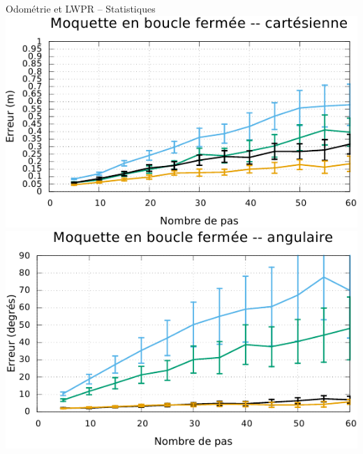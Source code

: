 \begin{frame}[noframenumbering]{Odométrie et LWPR -- Statistiques}
    \includegraphics[type=pdf,ext=.pdf,read=.pdf,width=0.25\linewidth]{../plot/OdometryLWPR/carpet_close_compare_cart}
    \includegraphics[type=pdf,ext=.pdf,read=.pdf,width=0.25\linewidth]{../plot/OdometryLWPR/carpet_close_compare_angle}
    \newline
\end{frame}

